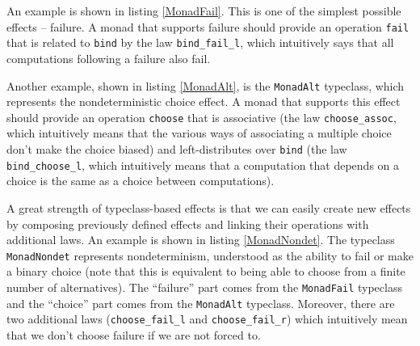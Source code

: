 \documentclass[declaration,inz,english,shortabstract]{iithesis}
\newcommand{\m}[1]{\texttt{#1}}
\begin{document}
An example is shown in listing \ref{MonadFail}. This is one of the simplest possible effects -- failure. A monad that supports failure should provide an operation \m{fail} that is related to \m{bind} by the law \m{bind\_fail\_l}, which intuitively says that all computations following a failure also fail.


Another example, shown in listing \ref{MonadAlt}, is the \m{MonadAlt} typeclass, which represents the nondeterministic choice effect. A monad that supports this effect should provide an operation \m{choose} that is associative (the law \m{choose\_assoc}, which intuitively means that the various ways of associating a multiple choice don't make the choice biased) and left-distributes over \m{bind} (the law \m{bind\_choose\_l}, which intuitively means that a computation that depends on a choice is the same as a choice between computations).


A great strength of typeclass-based effects is that we can easily create new effects by composing previously defined effects and linking their operations with additional laws. An example is shown in listing \ref{MonadNondet}. The typeclass \m{MonadNondet} represents nondeterminism, understood as the ability to fail or make a binary choice (note that this is equivalent to being able to choose from a finite number of alternatives). The ``failure'' part comes from the \m{MonadFail} typeclass and the ``choice'' part comes from the \m{MonadAlt} typeclass. Moreover, there are two additional laws (\m{choose\_fail\_l} and \m{choose\_fail\_r}) which intuitively mean that we don't choose failure if we are not forced to.

\end{document}
